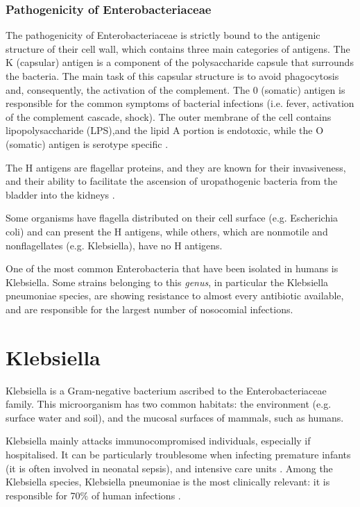 \documentclass[11pt]{report}
\begin{document}
\subsubsection{Pathogenicity of Enterobacteriaceae}

The pathogenicity of Enterobacteriaceae is strictly bound to the antigenic structure of their cell wall, which contains three main categories of antigens.
The K (capsular) antigen is a component of the polysaccharide capsule that surrounds the bacteria.
The main task of this capsular structure is to avoid phagocytosis and, consequently, the activation of the complement.
The 0 (somatic) antigen is responsible for the common symptoms of bacterial infections (i.e. fever, activation of the complement cascade, shock).
The outer membrane of the cell contains lipopolysaccharide (LPS),and the lipid A portion is endotoxic, while the O (somatic) antigen is serotype specific \cite{guentzel1996escherichia}.

The H antigens are flagellar proteins, and they are known for their invasiveness, and their ability to facilitate the ascension of uropathogenic bacteria from the bladder into the kidneys \cite{wiles2008origins}.

Some organisms have flagella distributed on their cell surface (e.g. Escherichia coli) and can present the H antigens, while others, which are nonmotile and nonflagellates (e.g. Klebsiella), have no H antigens.

One of the most common Enterobacteria that have been isolated in humans is Klebsiella.
Some strains belonging to this \emph{genus}, in particular the Klebsiella pneumoniae species, are showing resistance to almost every antibiotic available, and are responsible for the largest number of nosocomial infections.

\section{Klebsiella}
Klebsiella is a Gram-negative bacterium ascribed to the Enterobacteriaceae family.
This microorganism has two common habitats: the environment (e.g. surface water and soil), and the mucosal surfaces of mammals, such as humans.

Klebsiella mainly attacks immunocompromised individuals, especially if hospitalised.
It can be particularly troublesome when infecting premature infants (it is often involved in neonatal sepsis), and intensive care units \cite{podschun1998klebsiella}.
Among the Klebsiella species, Klebsiella pneumoniae is the most clinically relevant: it is responsible for 70$\%$ of human infections \cite{Pitout2015}.
\end{document}
